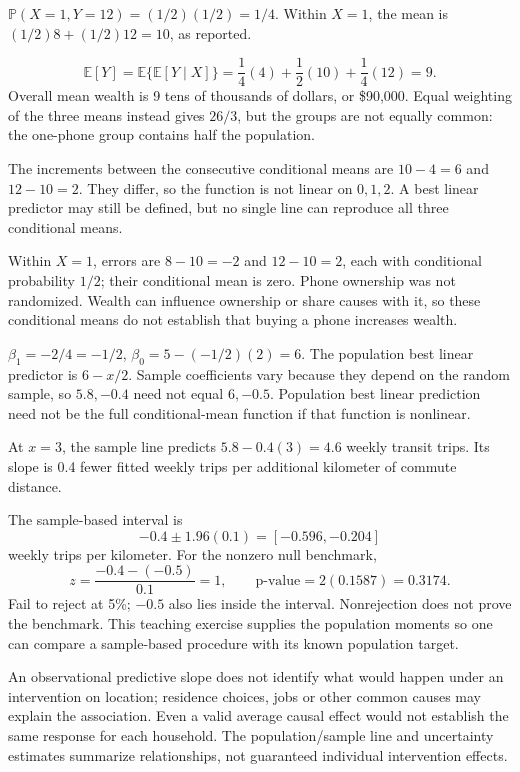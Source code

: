 \documentclass[11pt]{article}
\begin{document}
\begin{parts}
\item $\mathbb P(X=1,Y=12)=(1/2)(1/2)=1/4$. Within $X=1$, the mean is $(1/2)8+(1/2)12=10$, as reported.
\item
\[
\mathbb E[Y]=\mathbb E\{\mathbb E[Y\mid X]\}
=\frac14(4)+\frac12(10)+\frac14(12)=9.
\]
Overall mean wealth is 9 tens of thousands of dollars, or \$90,000. Equal weighting of the three means instead gives $26/3$, but the groups are not equally common: the one-phone group contains half the population.
\item The increments between the consecutive conditional means are $10-4=6$ and $12-10=2$. They differ, so the function is not linear on $0,1,2$. A best linear predictor may still be defined, but no single line can reproduce all three conditional means.
\item Within $X=1$, errors are $8-10=-2$ and $12-10=2$, each with conditional probability $1/2$; their conditional mean is zero. Phone ownership was not randomized. Wealth can influence ownership or share causes with it, so these conditional means do not establish that buying a phone increases wealth.
\end{parts}

\begin{parts}
\item $\beta_1=-2/4=-1/2$, $\beta_0=5-(-1/2)(2)=6$. The population best linear predictor is $6-x/2$. Sample coefficients vary because they depend on the random sample, so $5.8,-0.4$ need not equal $6,-0.5$. Population best linear prediction need not be the full conditional-mean function if that function is nonlinear.
\item At $x=3$, the sample line predicts $5.8-0.4(3)=4.6$ weekly transit trips. Its slope is 0.4 fewer fitted weekly trips per additional kilometer of commute distance.
\item The sample-based interval is
\[
-0.4\pm1.96(0.1)=[-0.596,-0.204]
\]
weekly trips per kilometer. For the nonzero null benchmark,
\[
z=\frac{-0.4-(-0.5)}{0.1}=1,\qquad
\text{p-value}=2(0.1587)=0.3174.
\]
Fail to reject at 5\%; $-0.5$ also lies inside the interval. Nonrejection does not prove the benchmark. This teaching exercise supplies the population moments so one can compare a sample-based procedure with its known population target.
\item An observational predictive slope does not identify what would happen under an intervention on location; residence choices, jobs or other common causes may explain the association. Even a valid average causal effect would not establish the same response for each household. The population/sample line and uncertainty estimates summarize relationships, not guaranteed individual intervention effects.
\end{parts}
\end{document}
